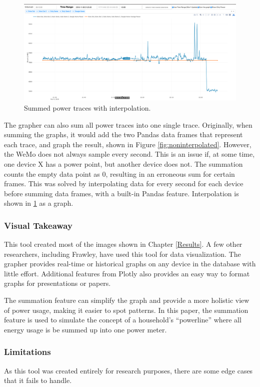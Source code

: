 \begin{figure}[H]
    \centering
    \includegraphics[width=1\textwidth]{figures/interpolated.png}
    \caption{Summed power traces with interpolation.}
    \label{fig:interpolated}
\end{figure}

The grapher can also sum all power traces into one single trace. Originally, when summing the graphs, it would add the two Pandas data frames that represent each trace, and graph the result, shown in Figure \ref{fig:noninterpolated}. However, the WeMo does not always sample every second. This is an issue if, at some time, one device X has a power point, but another device does not. The summation counts the empty data point as 0, resulting in an erroneous sum for certain frames. This was solved by interpolating data for every second for each device before summing data frames, with a built-in Pandas feature. Interpolation is shown in \ref{fig:interpolated} as a graph.

\subsubsection{Visual Takeaway}
This tool created most of the images shown in Chapter \ref{Results}. A few other researchers, including Frawley, have used this tool for data visualization. The grapher provides real-time or historical graphs on any device in the database with little effort. Additional features from Plotly also provides an easy way to format graphs for presentations or papers.

The summation feature can simplify the graph and provide a more holistic view of power usage, making it easier to spot patterns. In this paper, the summation feature is used to simulate the concept of a household's ``powerline'' where all energy usage is be summed up into one power meter.

\subsubsection{Limitations}
As this tool was created entirely for research purposes, there are some edge cases that it fails to handle.

